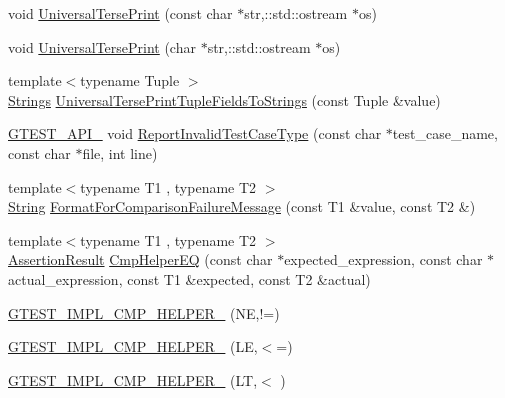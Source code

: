 \begin{DoxyCompactItemize}
\item 
void \hyperlink{namespacetesting_1_1internal_ae48ed1fb26cf9f2670c340b946cc373b}{\-Universal\-Terse\-Print} (const char $\ast$str,\-::std\-::ostream $\ast$os)
\item 
void \hyperlink{namespacetesting_1_1internal_a3e7d596ecc48aa301ed5e3123a3701fb}{\-Universal\-Terse\-Print} (char $\ast$str,\-::std\-::ostream $\ast$os)
\item 
{\footnotesize template$<$typename Tuple $>$ }\\\hyperlink{namespacetesting_1_1internal_a6d618e88721d4c38cbecabe0d2e8341c}{\-Strings} \hyperlink{namespacetesting_1_1internal_a7e60d1478b074801c766eeee9be6c772}{\-Universal\-Terse\-Print\-Tuple\-Fields\-To\-Strings} (const \-Tuple \&value)
\item 
\hyperlink{gtest-port_8h_aa73be6f0ba4a7456180a94904ce17790}{\-G\-T\-E\-S\-T\-\_\-\-A\-P\-I\-\_\-} void \hyperlink{namespacetesting_1_1internal_a864171ad4983f5b8e4258d0d5db0c03b}{\-Report\-Invalid\-Test\-Case\-Type} (const char $\ast$test\-\_\-case\-\_\-name, const char $\ast$file, int line)
\item 
{\footnotesize template$<$typename T1 , typename T2 $>$ }\\\hyperlink{classtesting_1_1internal_1_1String}{\-String} \hyperlink{namespacetesting_1_1internal_af9be1d3d9bbec168d911b750d1d00c5f}{\-Format\-For\-Comparison\-Failure\-Message} (const \-T1 \&value, const \-T2 \&)
\item 
{\footnotesize template$<$typename T1 , typename T2 $>$ }\\\hyperlink{classtesting_1_1AssertionResult}{\-Assertion\-Result} \hyperlink{namespacetesting_1_1internal_aece0b2a63a1af2ace0b3e70dfcb086a5}{\-Cmp\-Helper\-E\-Q} (const char $\ast$expected\-\_\-expression, const char $\ast$actual\-\_\-expression, const \-T1 \&expected, const \-T2 \&actual)
\item 
\hyperlink{namespacetesting_1_1internal_ac8cf80686ba04b6eebb157617c2ca1f7}{\-G\-T\-E\-S\-T\-\_\-\-I\-M\-P\-L\-\_\-\-C\-M\-P\-\_\-\-H\-E\-L\-P\-E\-R\-\_\-} (\-N\-E,!=)
\item 
\hyperlink{namespacetesting_1_1internal_a9fffc421d78a5a07a9c25177f68103a8}{\-G\-T\-E\-S\-T\-\_\-\-I\-M\-P\-L\-\_\-\-C\-M\-P\-\_\-\-H\-E\-L\-P\-E\-R\-\_\-} (\-L\-E,$<$=)
\item 
\hyperlink{namespacetesting_1_1internal_ae8190b68b81ff034772b7aedf296bacc}{\-G\-T\-E\-S\-T\-\_\-\-I\-M\-P\-L\-\_\-\-C\-M\-P\-\_\-\-H\-E\-L\-P\-E\-R\-\_\-} (\-L\-T,$<$ )
\item 

\end{DoxyCompactItemize}
